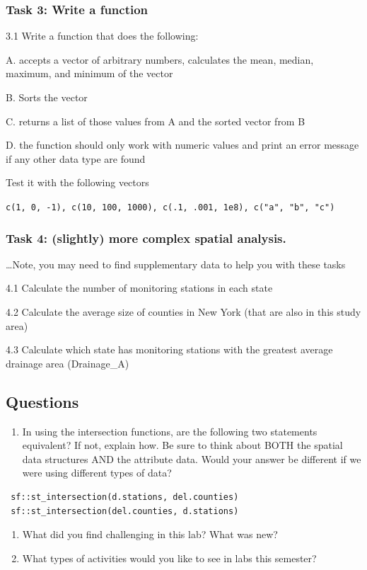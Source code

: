 \documentclass[]{article}
\providecommand{\tightlist}{%
  \setlength{\itemsep}{0pt}\setlength{\parskip}{0pt}}
\begin{document}
\subsubsection{Task 3: Write a function}\label{task-3-write-a-function}

3.1 Write a function that does the following:

A. accepts a vector of arbitrary numbers, calculates the mean, median,
maximum, and minimum of the vector

B. Sorts the vector

C. returns a list of those values from A and the sorted vector from B

D. the function should only work with numeric values and print an error
message if any other data type are found

Test it with the following vectors

\texttt{c(1,\ 0,\ -1),\ c(10,\ 100,\ 1000),\ c(.1,\ .001,\ 1e8),\ c("a",\ "b",\ "c")}

\subsubsection{Task 4: (slightly) more complex spatial
analysis.}\label{task-4-slightly-more-complex-spatial-analysis.}

\ldots Note, you may need to find supplementary data to help you with
these tasks

4.1 Calculate the number of monitoring stations in each state

4.2 Calculate the average size of counties in New York (that are also in
this study area)

4.3 Calculate which state has monitoring stations with the greatest
average drainage area (Drainage\_A)

\subsection{Questions}\label{questions}

\begin{enumerate}
\def\labelenumi{\arabic{enumi}.}
\tightlist
\item
  In using the intersection functions, are the following two statements
  equivalent? If not, explain how. Be sure to think about BOTH the
  spatial data structures AND the attribute data. Would your answer be
  different if we were using different types of data?
\end{enumerate}

\begin{verbatim}
 sf::st_intersection(d.stations, del.counties)
 sf::st_intersection(del.counties, d.stations)
\end{verbatim}

\begin{enumerate}
\def\labelenumi{\arabic{enumi}.}
\setcounter{enumi}{1}
\item
  What did you find challenging in this lab? What was new?
\item
  What types of activities would you like to see in labs this semester?
\end{enumerate}
\end{document}
